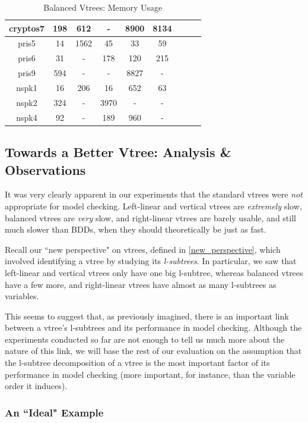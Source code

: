\documentclass[11pt]{report}
\begin{document}
\begin{table}
\begin{tabular}{|*{9}{c|}}
cryptos7 & 198& 612 & - & 8900 & 8134 \\ \hline
pris5 & 14 & 1562 & 45 & 33& 59 \\\hline
pris6 &31 & - & 178 & 120& 215 \\ \hline
pris9 &594 & - & - & 8827& -\\ \hline
nspk1 & 16 & 206 & 16 & 652& 63 \\ \hline
nspk2 &324 & - & 3970 & - &- \\ \hline
nspk4 &92 & - & 189 & 960& - \\ \hline
\end{tabular}
\caption{Balanced Vtrees: Memory Usage}
\label{table:otherstandardvtrees2memory}
\end{table}


\subsection{Towards a Better Vtree: Analysis \& Observations}
\label{analysis_example}

It was very clearly apparent in our experiments that the standard vtrees were \textit{not} appropriate for model checking. Left-linear and vertical vtrees are \textit{extremely} slow, balanced vtrees are \textit{very} slow, and right-linear vtrees are barely usable, and still much slower than BDDs, when they should theoretically be just as fast. 

Recall our ``new perspective" on vtrees, defined in \ref{new_perspective}, which involved identifying a vtree by studying its \textit{l-subtrees}. In particular, we saw that left-linear and vertical vtrees only have one big l-subtree, whereas balanced vtrees have a few more, and right-linear vtrees have almost as many l-subtrees as variables.

This seems to suggest that, as previously imagined, there is an important link between a vtree's l-subtrees and its performance in model checking. Although the experiments conducted so far are not enough to tell us much more about the nature of this link, we will base the rest of our evaluation on the assumption that the l-subtree decomposition of a vtree is the most important factor of its performance in model checking (more important, for instance, than the variable order it induces). 

\subsubsection{An ``Ideal" Example}
\end{document}
